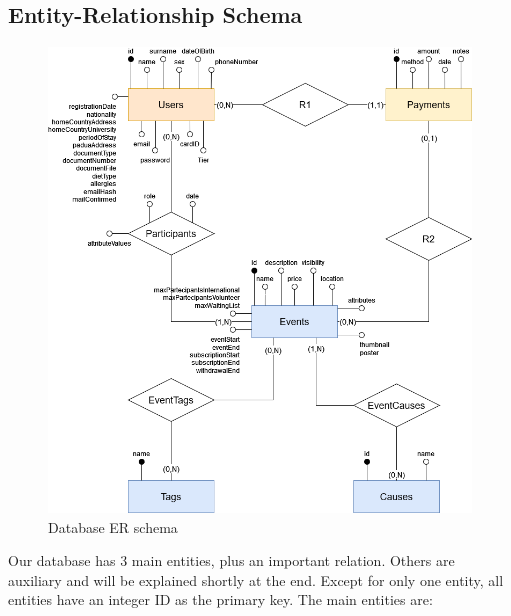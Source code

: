 \subsection{Entity-Relationship Schema}
\begin{figure}[h!]
    \centering
    \includegraphics[width=1\textwidth]{images/ERSchema.png}
    \caption{Database ER schema}
    \label{fig:er_schema}
\end{figure}
Our database has 3 main entities, plus an important relation. Others are auxiliary
and will be explained shortly at the end. Except for only one entity, all entities have an integer ID
as the primary key. The main entities are:
